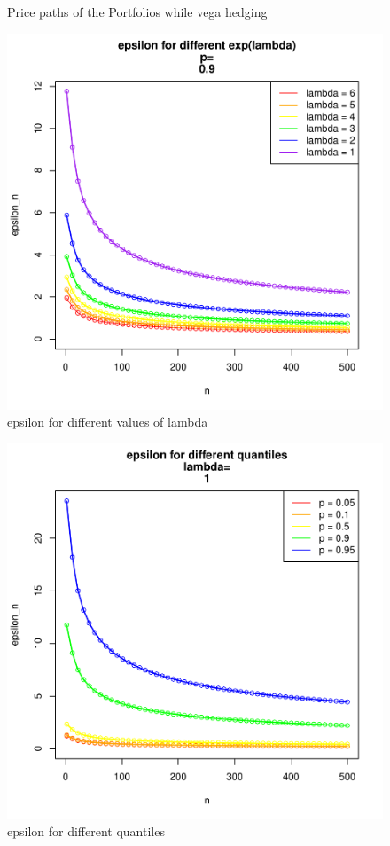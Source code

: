 \documentclass{beamer}
\begin{document}
\begin{frame}[fragile]
\vspace{-3mm}
\begin{figure}
\begin{center}
\caption{Price paths of the Portfolios while vega hedging}
\includegraphics[width = 9 cm,height = 6 cm]{lambdas.pdf}
\caption{epsilon for different values of lambda}
\end{center}
\end{figure}
\end{frame}
\begin{frame}[fragile]
\vspace{-0.5cm}
\begin{figure}
\begin{center}
\includegraphics[width = 9 cm,height = 6 cm]{ps.pdf}
\caption{epsilon for different quantiles}
\end{center}
\end{figure}
\end{frame}
\end{document}
